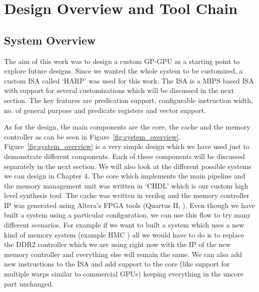 \setcounter{equation}{0}

\chapter{Design Overview and Tool Chain}
\label{chap: Design Overview and Tool Chain}

\section{ System Overview }
The aim of this work was to design a custom GP-GPU as a starting point to explore future designs. Since we wanted the whole system to be customized, a custom ISA %
called `HARP' was used for this work. The ISA is a MIPS based ISA with support for several customizations which will be discussed in the next section. The key features are predication support, configurable instruction width, no. of general purpose and predicate registers and vector support. 

As for the design, the main components are the core, the cache and the memory controller as can be seen in Figure~\ref{fig:system_overview}. Figure~\ref{fig:system_overview} is a very simple design which we have used just to demonstrate different components. Each of these components will be discussed separately in the next section. We will also look at the different possible systems we can design in Chapter 4. The core which implements the main pipeline and the memory management unit was written in `CHDL' which is our custom high level synthesis tool.%
The cache was written in verilog and the memory controller IP was generated using Altera's FPGA tools (Quartus II, \cite{quartus}). Even though we have built a system using a particular configuration, we can use this flow to try many different scenarios. For example if we want to built a system which uses a new kind of memory system (example HMC \cite{hmc}) all we would have to do is to replace the DDR2 controller which we are using right now with the IP of the new memory controller and everything else will remain the same. We can also add new instructions to the ISA and add support to the core (like support for multiple warps similar to commercial GPUs) keeping everything in the uncore part unchanged. 
\\

